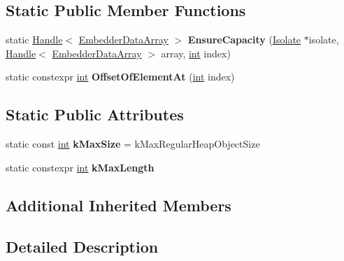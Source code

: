 \subsection*{Static Public Member Functions}
\begin{DoxyCompactItemize}
\item 
\mbox{\label{classv8_1_1internal_1_1EmbedderDataArray_a13e5bf0b935cd372b656fd7ad574c3f3}} 
static \mbox{\hyperlink{classv8_1_1internal_1_1Handle}{Handle}}$<$ \mbox{\hyperlink{classv8_1_1internal_1_1EmbedderDataArray}{Embedder\+Data\+Array}} $>$ {\bfseries Ensure\+Capacity} (\mbox{\hyperlink{classv8_1_1internal_1_1Isolate}{Isolate}} $\ast$isolate, \mbox{\hyperlink{classv8_1_1internal_1_1Handle}{Handle}}$<$ \mbox{\hyperlink{classv8_1_1internal_1_1EmbedderDataArray}{Embedder\+Data\+Array}} $>$ array, \mbox{\hyperlink{classint}{int}} index)
\item 
\mbox{\label{classv8_1_1internal_1_1EmbedderDataArray_a3499d13e47b7caeb496c52ab37927246}} 
static constexpr \mbox{\hyperlink{classint}{int}} {\bfseries Offset\+Of\+Element\+At} (\mbox{\hyperlink{classint}{int}} index)
\end{DoxyCompactItemize}
\subsection*{Static Public Attributes}
\begin{DoxyCompactItemize}
\item 
\mbox{\label{classv8_1_1internal_1_1EmbedderDataArray_ab80dcbf423059c4d4863e13becc6e933}} 
static const \mbox{\hyperlink{classint}{int}} {\bfseries k\+Max\+Size} = k\+Max\+Regular\+Heap\+Object\+Size
\item 
static constexpr \mbox{\hyperlink{classint}{int}} {\bfseries k\+Max\+Length}
\end{DoxyCompactItemize}
\subsection*{Additional Inherited Members}


\subsection{Detailed Description}



